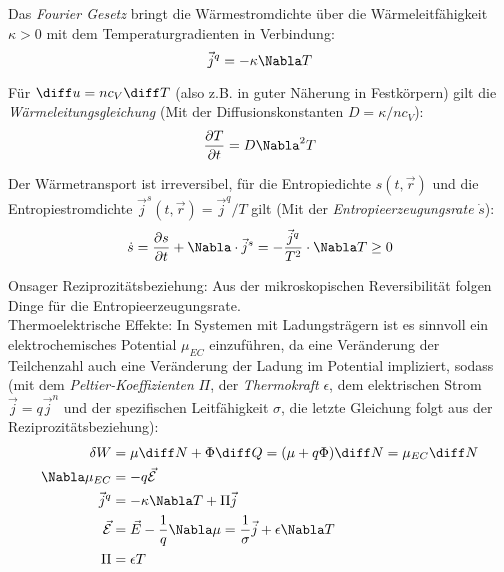 \documentclass[11pt]{article}
\numberwithin{equation}{section}
\begin{document}
        Das \emph{Fourier Gesetz} bringt die Wärmestromdichte über die Wärmeleitfähigkeit $\kappa >0$ mit dem Temperaturgradienten in Verbindung:
        \begin{equation}
          \vec{j}^q = -\kappa \Nabla T
        \end{equation}

        Für $\diff u = nc_V \diff T$ (also z.B. in guter Näherung in Festkörpern) gilt die \emph{Wärmeleitungsgleichung} (Mit der Diffusionskonstanten $D=\kappa/nc_V$):
        \begin{equation}
          \pder{T}{t} = D\Nabla^2 T
        \end{equation}

        Der Wärmetransport ist irreversibel, für die Entropiedichte $s(t,\vec{r})$ und die Entropiestromdichte $\vec{j}^s (t,\vec{r}) = \vec{j}^q/T$ gilt (Mit der \emph{Entropieerzeugungsrate} $\dot{s}$):
        \begin{equation}
          \dot{s} = \pder{s}{t} + \Nabla\cdot\vec{j}^s = - \frac{\vec{j}^q}{T^2}\cdot\Nabla T \ge 0
        \end{equation}

        Onsager Reziprozitätsbeziehung: Aus der mikroskopischen Reversibilität folgen Dinge für die Entropieerzeugungsrate.\\

        Thermoelektrische Effekte: In Systemen mit Ladungsträgern ist es sinnvoll ein elektrochemisches Potential $\mu_{EC}$ einzuführen, da eine Veränderung der Teilchenzahl auch eine Veränderung der Ladung im Potential impliziert, sodass (mit dem \emph{Peltier-Koeffizienten} $\Pi$, der \emph{Thermokraft} $\epsilon$, dem elektrischen Strom $\vec{j} = q\vec{j}^n$ und der spezifischen Leitfähigkeit $\sigma$, die letzte Gleichung folgt aus der Reziprozitätsbeziehung):
        \begin{equation}
          \begin{aligned}
            \delta W &= \mu \diff N + \Phi \diff Q = (\mu+q\Phi)\diff N = \mu_{EC} \diff N \\
            \Nabla \mu_{EC} &= -q\vec{\mathcal{E}} \\
            \vec{j}^q &= - \kappa \Nabla T + \Pi \vec{j} \\
            \vec{\mathcal{E}} &= \vec{E} - \frac{1}{q} \Nabla \mu = \frac{1}{\sigma} \vec{j} + \epsilon \Nabla T \\
            \Pi &= \epsilon T \\
          \end{aligned}
        \end{equation}
\end{document}
